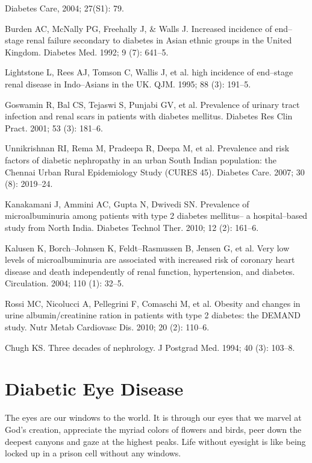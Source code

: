 \begin{thebibliography}{99}
 Diabetes Care, 2004; 27(S1): 79.

  Burden AC, McNally PG, Freehally J, \& Walls J. Increased incidence of end–stage renal failure secondary to diabetes in Asian ethnic groups in the United Kingdom. Diabetes Med. 1992; 9 (7): 641–5.

  Lightstone L, Rees AJ, Tomson C, Wallis J, et al. high incidence of end–stage renal disease in Indo–Asians in the UK. QJM. 1995; 88 (3): 191–5.

  Goswamin R, Bal CS, Tejaswi S, Punjabi GV, et al. Prevalence of urinary tract infection and renal scars in patients with diabetes mellitus. Diabetes Res Clin Pract. 2001; 53 (3): 181–6.

  Unnikrishnan RI, Rema M, Pradeepa R, Deepa M, et al. Prevalence and risk factors of diabetic nephropathy in an urban South Indian population: the Chennai Urban Rural Epidemiology Study (CURES 45). Diabetes Care. 2007; 30 (8): 2019–24.

  Kanakamani J, Ammini AC, Gupta N, Dwivedi SN. Prevalence of microalbuminuria among patients with type 2 diabetes mellitus– a hospital–based study from North India. Diabetes Technol Ther. 2010; 12 (2): 161–6.

  Kalusen K, Borch–Johnsen K, Feldt–Rasmussen B, Jensen G, et al. Very low levels of microalbuminuria are associated with increased risk of coronary heart disease and death independently of renal function, hypertension, and diabetes. Circulation. 2004; 110 (1): 32–5.

  Rossi MC, Nicolucci A, Pellegrini F, Comaschi M, et al. Obesity and changes in urine albumin/creatinine ration in patients with type 2 diabetes: the DEMAND study. Nutr Metab Cardiovasc Dis. 2010; 20 (2): 110–6.

  Chugh KS. Three decades of nephrology. J Postgrad Med. 1994; 40 (3): 103–8.

 \end{thebibliography}


\chapter{Diabetic Eye Disease}\label{chap15}

The eyes are our windows to the world. It is through our eyes that we marvel at God’s creation, appreciate the myriad colors of flowers and birds, peer down the deepest canyons and gaze at the highest peaks. Life without eyesight is like being locked up in a prison cell without any windows.

